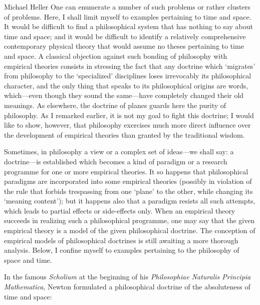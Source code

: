 \begin{artengenv}{Michael Heller}
One can enumerate a number of such problems or rather clusters of problems. Here, I shall limit myself to examples
pertaining to time and space. It would be difficult to find a philosophical system that has nothing to say about time
and space; and it would be difficult to identify a relatively comprehensive contemporary physical theory that would
assume no theses pertaining to time and space. A classical objection against such bonding of philosophy with empirical
theories consists in stressing the fact that any doctrine which `migrates' from philosophy to the `specialized'
disciplines loses irrevocably its philosophical character, and the only thing that speaks to its philosophical origins
are words, which---even though they sound the same---have completely changed their old meanings. As elsewhere, the doctrine
of planes guards here the purity of philosophy. As I remarked earlier, it is not my goal to fight this doctrine; I
would like to show, however, that philosophy exercises much more direct influence over the development of empirical
theories than granted by the traditional wisdom.

Sometimes, in philosophy a view or a complex set of ideas---we shall say: a doctrine---is established which becomes a
kind of paradigm or a research programme for one or more empirical theories. It so happens that philosophical paradigms
are incorporated into some empirical theories (possibly in violation of the rule that forbids trespassing from one
`plane' to the other, while changing its `meaning content'); but it happens also that a paradigm resists all such
attempts, which leads to partial effects or side-effects only. When an empirical theory succeeds in realizing such a
philosophical programme, one may say that the given empirical theory is a model of the given philosophical doctrine.
The conception of empirical models of philosophical doctrines is still awaiting a more thorough analysis. Below, I
confine myself to examples pertaining to the philosophy of space and time.

In the famous \textit{Scholium} at the beginning of his \textit{Philosophiae Naturalis Principia Mathematica},
Newton formulated a philosophical doctrine of the absoluteness of time and space:



\end{artengenv}
